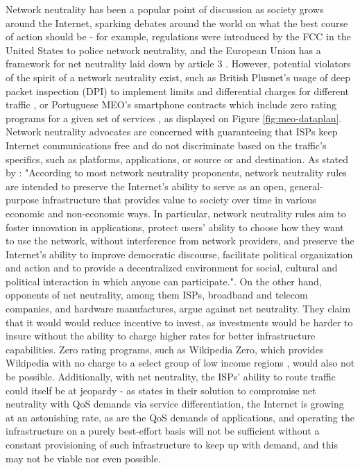     Network neutrality has been a popular point of discussion as society grows around the Internet, sparking debates around the world on what the best course of action should be - for example, regulations were introduced by the FCC in the United States \cite{fcc} to police network neutrality, and the European Union has a framework for net neutrality laid down by article 3 \cite{article-3}.
    However, potential violators of the spirit of a network neutrality exist, such as British Plusnet's usage of deep packet inspection (DPI) to implement limits and differential charges for different traffic \cite{arstechnica}, or Portuguese MEO's smartphone contracts which include zero rating programs for a given set of services \cite{meo-packages}, as displayed on Figure \ref{fig:meo-dataplan}.
    Network neutrality advocates are concerned with guaranteeing that ISPs keep Internet communications free and do not discriminate based on the traffic's specifics, such as platforms, applications, or source or and destination.
    As stated by \cite{qos-framework}: "According to most network neutrality proponents, network neutrality rules are intended to preserve the Internet's ability to serve as an open, general-purpose infrastructure that provides value to society over time in various economic and non-economic ways. In particular, network neutrality rules aim to foster innovation in applications, protect users' ability to choose how they want to use the network, without interference from network providers, and preserve the Internet's ability to improve democratic discourse, facilitate political organization and action and to provide a decentralized environment for social, cultural and political interaction in which anyone can participate.".
    On the other hand, opponents of net neutrality, among them ISPs, broadband and telecom companies, and hardware manufactures, argue against net neutrality.
    They claim that it would would reduce incentive to invest, as investments would be harder to insure without the ability to charge higher rates for better infrastructure capabilities.
    Zero rating programs, such as Wikipedia Zero, which provides Wikipedia with no charge to a select group of low income regions  , would also not be possible.
    Additionally, with net neutrality, the ISPs' ability to route traffic could itself be at jeopardy - as \cite{jerzy} states in their solution to compromise net neutrality with QoS demands via service differentiation, the Internet is growing at an astonishing rate, as are the QoS demands of applications, and operating the infrastructure on a purely best-effort basis will not be sufficient without a constant provisioning of such infrastructure to keep up with demand, and this may not be viable nor even possible.

